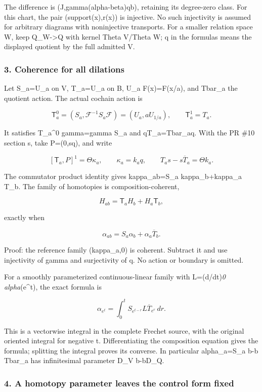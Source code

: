 The difference is (J,gamma(alpha-beta)qb), retaining its degree-zero class. For this chart, the pair
(support(x),r(x)) is injective. No such injectivity is assumed for arbitrary diagrams with
noninjective transports. For a smaller relation space W, keep Q\_W-\textgreater Q with kernel Theta
V/Theta W; q in the formulas means the displayed quotient by the full admitted V.

\subsubsection{3. Coherence for all dilations}\label{pr_11:coherence-for-all-dilations}

Let S\_a=U\_a on V, T\_a=U\_a on B, U\_a F(x)=F(x/a), and Tbar\_a the quotient action. The actual
cochain action is

\[\mathsf T_a^0=(S_a,\mathcal F^{-1}S_a\mathcal F)=(U_a,aU_{1/a}),\qquad\mathsf T_a^1=T_a.\]

It satisfies T\_a\^{}0 gamma=gamma S\_a and qT\_a=Tbar\_aq. With the PR \#10 section s, take
P=(0,sq), and write

\[[\mathsf T_a,P]^1=\Theta\kappa_a,\qquad\kappa_a=k_aq,\qquad T_as-s\overline T_a=\Theta k_a.\]

The commutator product identity gives kappa\_ab=S\_a kappa\_b+kappa\_a T\_b. The family of
homotopies is composition-coherent,

\[H_{ab}=\mathsf T_aH_b+H_a\mathsf T_b,\]

exactly when

\[\boxed{\alpha_{ab}=S_a\alpha_b+\alpha_a\overline T_b.}\]

Proof: the reference family (kappa\_a,0) is coherent. Subtract it and use injectivity of gamma and
surjectivity of q. No action or boundary is omitted.

For a smoothly parameterized continuous-linear family with L=(d/dt)\textbar{}\emph{0 alpha}(e\^{}t),
the exact formula is

\[\alpha_{e^t}=\int_0^t S_{e^{t-r}}L\overline T_{e^r}\,dr.\]

This is a vectorwise integral in the complete Frechet source, with the original oriented integral
for negative t. Differentiating the composition equation gives the formula; splitting the integral
proves its converse. In particular alpha\_a=S\_a b-b Tbar\_a has infinitesimal parameter D\_V
b-bD\_Q.

\subsubsection{4. A homotopy parameter leaves the control form
fixed}\label{pr_11:a-homotopy-parameter-leaves-the-control-form-fixed}

